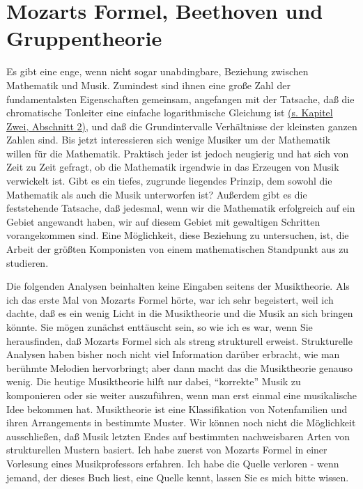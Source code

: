 
\section{Mozarts Formel, Beethoven und Gruppentheorie}\hypertarget{c1iv4}{}

Es gibt eine enge, wenn nicht sogar unabdingbare, Beziehung zwischen Mathematik und Musik.
Zumindest sind ihnen eine große Zahl der fundamentalsten Eigenschaften gemeinsam, angefangen mit der Tatsache, daß die chromatische Tonleiter eine einfache logarithmische Gleichung ist \hyperlink{c2_2}{(s. Kapitel Zwei, Abschnitt 2)}, und daß die Grundintervalle Verhältnisse der kleinsten ganzen Zahlen sind.
Bis jetzt interessieren sich wenige Musiker um der Mathematik willen für die Mathematik.
Praktisch jeder ist jedoch neugierig und hat sich von Zeit zu Zeit gefragt, ob die Mathematik irgendwie in das Erzeugen von Musik verwickelt ist.
Gibt es ein tiefes, zugrunde liegendes Prinzip, dem sowohl die Mathematik als auch die Musik unterworfen ist?
Außerdem gibt es die feststehende Tatsache, daß jedesmal, wenn wir die Mathematik erfolgreich auf ein Gebiet angewandt haben, wir auf diesem Gebiet mit gewaltigen Schritten vorangekommen sind.
Eine Möglichkeit, diese Beziehung zu untersuchen, ist, die Arbeit der größten Komponisten von einem mathematischen Standpunkt aus zu studieren.

Die folgenden Analysen beinhalten keine Eingaben seitens der Musiktheorie.
Als ich das erste Mal von Mozarts Formel hörte, war ich sehr begeistert, weil ich dachte, daß es ein wenig Licht in die Musiktheorie und die Musik an sich bringen könnte.
Sie mögen zunächst enttäuscht sein, so wie ich es war, wenn Sie herausfinden, daß Mozarts Formel sich als streng strukturell erweist.
Strukturelle Analysen haben bisher noch nicht viel Information darüber erbracht, wie man berühmte Melodien hervorbringt; aber dann macht das die Musiktheorie genauso wenig.
Die heutige Musiktheorie hilft nur dabei, \enquote{korrekte} Musik zu komponieren oder sie weiter auszuführen, wenn man erst einmal eine musikalische Idee bekommen hat.
Musiktheorie ist eine Klassifikation von Notenfamilien und ihren Arrangements in bestimmte Muster.
Wir können noch nicht die Möglichkeit ausschließen, daß Musik letzten Endes auf bestimmten nachweisbaren Arten von strukturellen Mustern basiert.
Ich habe zuerst von Mozarts Formel in einer Vorlesung eines Musikprofessors erfahren.
Ich habe die Quelle verloren - wenn jemand, der dieses Buch liest, eine Quelle kennt, lassen Sie es mich bitte wissen.

